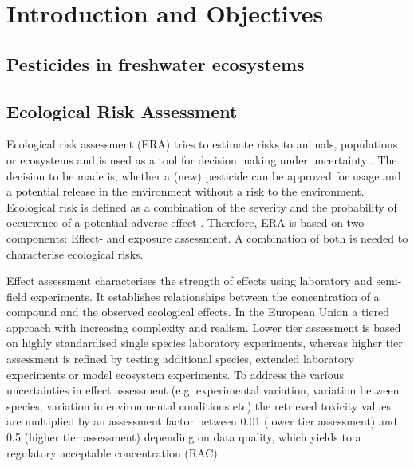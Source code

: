 
\chapter{Introduction and Objectives}
\label{sec:introduction} 

\section{Pesticides in freshwater ecosystems}



\section{Ecological Risk Assessment}
Ecological risk assessment (ERA) tries to estimate risks to animals, populations or ecosystems and is used as a tool for decision making under uncertainty \citep{newman_fundamentals_2015}. 
The decision to be made is, whether a (new) pesticide can be approved for usage and a potential release in the environment without a risk to the environment. 
Ecological risk is defined as a combination of the severity and the probability of occurrence of a potential adverse effect \citep{suter_ecological_2007}. 
Therefore, ERA is based on two components: Effect- and exposure assessment.
A combination of both is needed to characterise ecological risks.

Effect assessment characterises the strength of effects using laboratory and semi-field experiments.
It establishes relationships between the concentration of a compound and the observed ecological effects.
In the European Union a tiered approach with increasing complexity and realism.
Lower tier assessment is based on highly standardised single species laboratory experiments, whereas higher tier assessment is refined by testing additional species, extended laboratory experiments or model ecosystem experiments. 
To address the various uncertainties in effect assessment (e.g. experimental variation, variation between species, variation in environmental conditions etc) the retrieved toxicity values are multiplied by an assessment factor between 0.01 (lower tier assessment) and 0.5 (higher tier assessment) depending on data quality, which yields to a regulatory acceptable concentration (RAC) \citep{efsa_guidance_2013}. 

